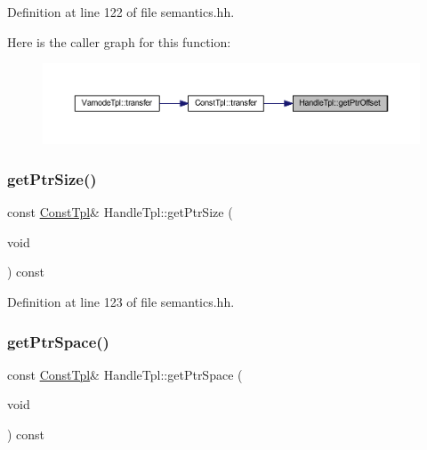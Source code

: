 Definition at line 122 of file semantics.\+hh.

Here is the caller graph for this function\+:
\nopagebreak
\begin{figure}[H]
\begin{center}
\leavevmode
\includegraphics[width=350pt]{class_handle_tpl_abdf430c75dc094764836095bd4bc4a8c_icgraph}
\end{center}
\end{figure}
\mbox{\label{class_handle_tpl_a6c6b9afa686c7e8d76a0b2fc8292db6c}} 
\subsubsection{\texorpdfstring{getPtrSize()}{getPtrSize()}}
{\footnotesize\ttfamily const \mbox{\hyperlink{class_const_tpl}{Const\+Tpl}}\& Handle\+Tpl\+::get\+Ptr\+Size (\begin{DoxyParamCaption}\item[{void}]{ }\end{DoxyParamCaption}) const\hspace{0.3cm}{\ttfamily [inline]}}



Definition at line 123 of file semantics.\+hh.

\mbox{\label{class_handle_tpl_aff10fb854af932febb9d02f585e0f2ad}} 
\subsubsection{\texorpdfstring{getPtrSpace()}{getPtrSpace()}}
{\footnotesize\ttfamily const \mbox{\hyperlink{class_const_tpl}{Const\+Tpl}}\& Handle\+Tpl\+::get\+Ptr\+Space (\begin{DoxyParamCaption}\item[{void}]{ }\end{DoxyParamCaption}) const\hspace{0.3cm}{\ttfamily [inline]}}



